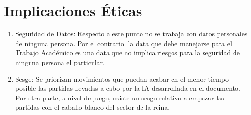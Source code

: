 \section{Implicaciones Éticas}
\begin{enumerate}
\item Seguridad de Datos: Respecto a este punto no se trabaja con datos personales de ninguna persona. Por el contrario, la data que debe manejarse para el Trabajo Académico es una data que no implica riesgos para la seguridad de ninguna persona el particular.
\item Sesgo: Se priorizan movimientos que puedan acabar en el menor tiempo posible las partidas llevadas a cabo por la IA desarrollada en el documento. Por otra parte, a nivel de juego, existe un sesgo relativo a empezar las partidas con el caballo blanco del sector de la reina.
\end{enumerate}
